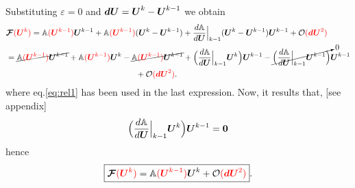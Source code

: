 \documentclass[a4paper,10pt]{article}
\newcommand{\bm}[1]{\text{\boldmath$#1$\unboldmath}}
\newcommand{\DiscFunc}[1]{\bm{#1}}
\newcommand{\SecOrdTens}[1]{\bm{\mathcal{#1}}}
\renewcommand{\u}{\DiscFunc{U}}
\newcommand{\F}{\SecOrdTens{F}}
\newcommand{\tot}[1]{\mathbb{#1}}  %
\newcommand{\fo}[1]{{ \color{red} ( #1 )\color{black} }} %
\begin{document}
Substituting $\varepsilon=0$ and $\bm{dU}=\u^k-\u^{k-1}$ we obtain
\begin{equation*}
\begin{split}
 &\F\fo{\u^k} = \tot{A}\fo{\u^{k-1}}\u^{k-1} +\tot{A}\fo{\u^{k-1}}(\u^k-\u^{k-1})+ \frac{d\tot{A}}{d\u}\Big|_{k-1}(\u^k-\u^{k-1})\u^{k-1} + \mathcal{O}\fo{\bm{dU}^2}\\ &=\cancel{\tot{A}\fo{\u^{k-1}}\u^{k-1}}+\tot{A}\fo{\u^{k-1}}\u^k - \cancel{\tot{A}\fo{\u^{k-1}}\u^{k-1}}+\Big(\frac{d\tot{A}}{d\u}\Big|_{k-1}\u^k\Big)\u^{k-1} - \cancelto{0}{\Big(\frac{d\tot{A}}{d\u}\Big|_{k-1}\u^{k-1}\Big)}\u^{k-1}\\
 &\qquad\qquad\qquad\qquad\qquad\qquad\qquad\qquad+\mathcal{O}\fo{\bm{dU}^2}.
\end{split}
\end{equation*}
where eq.\eqref{eq:rel1} has been used in the last expression. Now, it results that, [see appendix]
\[
 \Big(\frac{d\tot{A}}{d\u}\Big|_{k-1}\u^k\Big)\u^{k-1} = \bm{0}
\]
hence
\begin{equation}\label{eq:lin-conv}
\boxed{
 \F\fo{\u^k} = \tot{A}\fo{\u^{k-1}}\u^k +\mathcal{O}\fo{\bm{dU}^2}
 }.
\end{equation}
\end{document}

